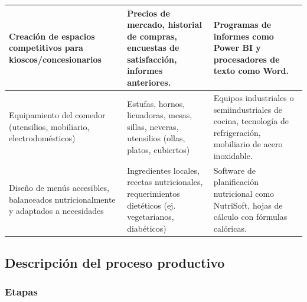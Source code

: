 \documentclass[letterpaper, 11pt]{report}
\begin{document}
\begin{longtable}{|p{.3\linewidth}|p{.3\linewidth}|p{.3\linewidth}|}
      Creación de espacios competitivos para kioscos/concesionarios        & Precios de
      mercado, historial de compras, encuestas de satisfacción, informes anteriores.
                                                                           & Programas de informes como Power BI y procesadores de texto como Word.
      \\\hline

      Equipamiento del comedor (utensilios, mobiliario, electrodomésticos) & Estufas,
      hornos, licuadoras, mesas, sillas, neveras, utensilios (ollas, platos,
      cubiertos)                                                           & Equipos industriales o semiindustriales de cocina, tecnología de
      refrigeración, mobiliario de acero inoxidable.                                                                                                                      \\\hline

      Diseño de menús accesibles, balanceados nutricionalmente y adaptados a
      necesidades                                                          & Ingredientes locales, recetas nutricionales, requerimientos
      dietéticos (ej. vegetarianos, diabéticos)                            & Software de planificación
      nutricional como NutriSoft, hojas de cálculo con fórmulas calóricas.                                                                                                \\\hline
\end{longtable}

\subsection{Descripción del proceso productivo}

\subsubsection{Etapas}
\end{document}
